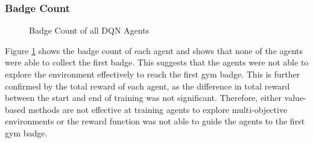 \subsubsection*{Badge Count}

\begin{figure}[H]
    \centering
    \caption{Badge Count of all DQN Agents}
    \label{fig:DQN_badge_count}
\end{figure}

Figure \ref{fig:DQN_badge_count} shows the badge count of each agent and shows that none of the agents were able to collect the first badge. This suggests that the agents were not able to explore the environment effectively to reach the first gym badge. This is further confirmed by the total reward of each agent, as the difference in total reward between the start and end of training was not significant. Therefore, either value-based methods are not effective at training agents to explore multi-objective environments or the reward function was not able to guide the agents to the first gym badge.

